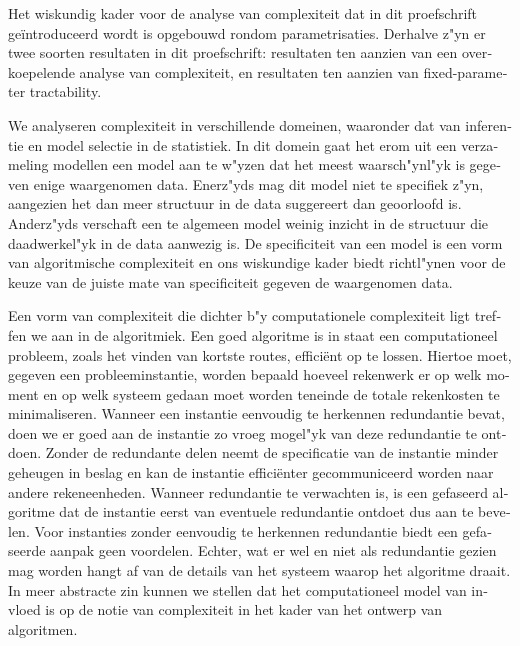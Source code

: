 {\begin{otherlanguage}{dutch}
Het wiskundig kader voor de analyse van complexiteit dat in dit proefschrift ge{\"i}ntroduceerd wordt is opgebouwd rondom parametrisaties.
Derhalve z"yn er twee soorten resultaten in dit proefschrift: resultaten ten aanzien van een overkoepelende analyse van complexiteit, en resultaten ten aanzien van fixed-parameter tractability.

We analyseren complexiteit in verschillende domeinen, waaronder dat van inferentie en model selectie in de statistiek.
In dit domein gaat het erom uit een verzameling modellen een model aan te w"yzen dat het meest waarsch"ynl"yk is gegeven enige waargenomen data.
Enerz"yds mag dit model niet te specifiek z"yn, aangezien het dan meer structuur in de data suggereert dan geoorloofd is.
Anderz"yds verschaft een te algemeen model weinig inzicht in de structuur die daadwerkel"yk in de data aanwezig is.
De specificiteit van een model is een vorm van algoritmische complexiteit en ons wiskundige kader biedt richtl"ynen voor de keuze van de juiste mate van specificiteit gegeven de waargenomen data.

Een vorm van complexiteit die dichter b"y computationele complexiteit ligt treffen we aan in de algoritmiek.
Een goed algoritme is in staat een computationeel probleem, zoals het vinden van kortste routes, effici{\"e}nt op te lossen.
Hiertoe moet, gegeven een probleeminstantie, worden bepaald hoeveel rekenwerk er op welk moment en op welk systeem gedaan moet worden teneinde de totale rekenkosten te minimaliseren.
Wanneer een instantie eenvoudig te herkennen redundantie bevat, doen we er goed aan de instantie zo vroeg mogel"yk van deze redundantie te ontdoen.
Zonder de redundante delen neemt de specificatie van de instantie minder geheugen in beslag en kan de instantie effici{\"e}nter gecommuniceerd worden naar andere rekeneenheden.
Wanneer redundantie te verwachten is, is een gefaseerd algoritme dat de instantie eerst van eventuele redundantie ontdoet dus aan te bevelen.
Voor instanties zonder eenvoudig te herkennen redundantie biedt een gefaseerde aanpak geen voordelen.
Echter, wat er wel en niet als redundantie gezien mag worden hangt af van de details van het systeem waarop het algoritme draait.
In meer abstracte zin kunnen we stellen dat het computationeel model van invloed is op de notie van complexiteit in het kader van het ontwerp van algoritmen.


\end{otherlanguage}}
